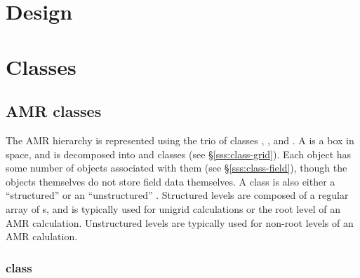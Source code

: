\documentclass[10pt]{article}
\begin{document}
\section{Design} \label{s:design}

\section{Classes} \label{ss:classes}

\subsection{AMR classes}

The AMR hierarchy is represented using the trio of classes
, , and .  A  is a
box in space, and is decomposed into  and
 classes (see \S\ref{sss:class-grid}).  Each
 object has some number of  objects
associated with them (see \S\ref{sss:class-field}), though the
 objects themselves do not store field data
themselves.  A  class is also either a ``structured''
 or an ``unstructured'' .
Structured levels are composed of a regular array of s, and
is typically used for unigrid calculations or the root level of an AMR
calculation.  Unstructured levels are typically used for non-root
levels of an AMR calulation.

\begin{center}
\end{center}

\subsubsection{ class} \label{sss:class-hierarchy}

\begin{center}
\end{center}
\end{document}
